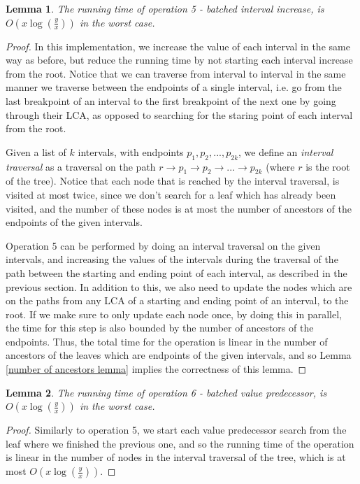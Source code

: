 \documentclass[11pt,a4paper]{article}
\newtheorem{lemma}{Lemma}
\theoremstyle{definition}
\theoremstyle{remark}
\begin{document}
\begin{lemma}
The running time of operation 5 - batched interval increase, is $O(x \log (\frac{y}{x}))$ in the worst case.
\end{lemma}
\begin{proof}
In this implementation, we increase the value of each interval in the same way as before, but reduce the running time by not starting each interval increase from the root. Notice that we can traverse from interval to interval in the same manner we traverse between the endpoints of a single interval, i.e. go from the last breakpoint of an interval to the first breakpoint of the next one by going through their LCA, as opposed to searching for the staring point of each interval from the root. 

Given a list of $k$ intervals, with endpoints $p_1,p_2,...,p_{2k}$, we define an \emph{interval traversal} as a traversal on the path $r \rightarrow p_1 \rightarrow p_2 \rightarrow ... \rightarrow p_{2k}$ (where $r$ is the root of the tree). Notice that each node that is reached by the interval traversal, is visited at most twice, since we don't search for a leaf which has already been visited, and the number of these nodes is at most the number of ancestors of the endpoints of the given intervals. 

Operation 5 can be performed by doing an interval traversal on the given intervals, and increasing the values of the intervals during the traversal of the path between the starting and ending point of each interval, as described in the previous section. In addition to this, we also need to update the nodes which are on the paths from any LCA of a starting and ending point of an interval, to the root. If we make sure to only update each node once, by doing this in parallel, the time for this step is also bounded by the number of ancestors of the endpoints. Thus, the total time for the operation is linear in the number of ancestors of the leaves which are endpoints of the given intervals, and so Lemma \ref{number of ancestors lemma} implies the correctness of this lemma.
\end{proof}


\begin{lemma}
The running time of operation 6 - batched value predecessor, is $O(x \log (\frac{y}{x}))$ in the worst case.
\end{lemma}
\begin{proof}
Similarly to operation 5, we start each value predecessor search from the leaf where we finished the previous one, and so the running time of the operation is linear in the number of nodes in the interval traversal of the tree, which is at most $O(x \log (\frac{y}{x}))$.
\end{proof}
\end{document}
